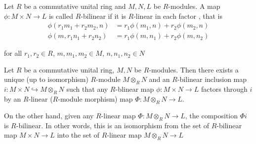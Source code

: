 \begin{definition}
	Let $R$ be a commutative unital ring and $M, N, L$ be $R$-modules. A map $\phi: M \times N \to L$ is called $R$-bilinear if it is $R$-linear in each factor , that is
	\begin{align*}
		\phi(r_1 m_1 + r_2 m_2, n) &= r_1 \phi(m_1, n) + r_2 \phi(m_2, n) \\
		\phi(m, r_1 n_1 + r_2 n_2) &= r_1 \phi(m, n_1) + r_2 \phi(m, n_2)
	\end{align*}
	
	for all $r_1, r_2 \in R$, $m, m_1, m_2 \in M$, $n, n_1, n_2 \in N$
\end{definition}

\begin{theorem}
	Let $R$ be a commutative unital ring, $M, N$ be $R$-modules. Then there exists a unique (up to isomorphism) $R$-module $M \otimes_R N$ and an $R$-bilinear inclusion map $i: M \times N \hookrightarrow M \otimes_R N$ such that any $R$-blinear map $\phi: M \times N \to L$ factors through $i$ by an $R$-linear ($R$-module morphism) map $\Phi: M \otimes_R N \to L$.
	\begin{center}
	\end{center}
	
	On the other hand, given any $R$-linear map $\Phi: M \otimes_R N \to L$, the composition $\Phi i$ is $R$-bilinear. In other words, this is an isomorphism from the set of $R$-bilinear map $M \times N \to L$ into the set of $R$-linear map $M \otimes_R N \to L$
\end{theorem}

